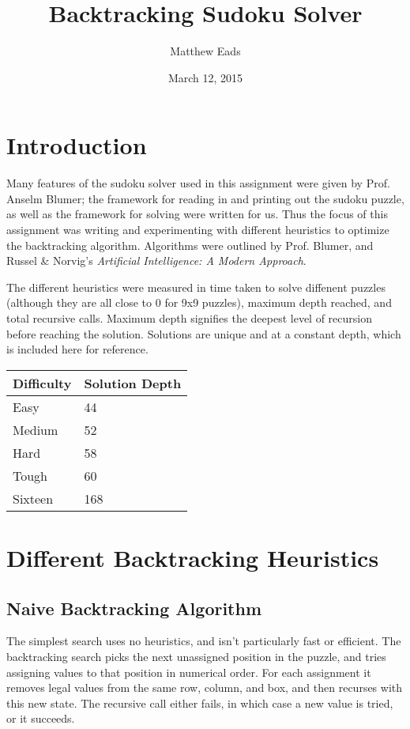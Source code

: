 \documentclass{article}
\begin{document}
\title{Backtracking Sudoku Solver}
\date{March 12, 2015}
\author{Matthew Eads}
\maketitle
\section{Introduction}
Many features of the sudoku solver used in this assignment were given
by Prof. Anselm Blumer; the framework for reading in and printing out the sudoku
puzzle, as well as the framework for solving were written for us.
Thus the focus of this assignment was writing and experimenting with
different heuristics to optimize the backtracking algorithm. Algorithms were
outlined by Prof. Blumer, and Russel \&{} Norvig's \textit{Artificial Intelligence:
A Modern Approach}.

The different heuristics were measured in time taken to solve diffenent
puzzles (although they are all close to 0 for 9x9 puzzles), 
maximum depth reached, and total recursive calls. 
Maximum depth signifies the deepest level of recursion before reaching
the solution. Solutions are unique and at a constant depth, which is
included here for reference. \bigskip

\begin{tabular}{l | l}
Difficulty & Solution Depth \\ \hline
Easy & 44 \\
Medium & 52 \\
Hard & 58 \\
Tough & 60 \\
Sixteen & 168 \\
\end{tabular}

\section{Different Backtracking Heuristics}
\subsection{Naive Backtracking Algorithm}
The simplest search uses no heuristics, and isn't particularly fast or
efficient. The backtracking search picks the next unassigned position
in the puzzle, and tries assigning values to that position in numerical
order. For each assignment it removes legal values from the same row, column,
and box, and then recurses with this new state. The recursive call either fails,
in which case a new value is tried, or it succeeds.
\end{document}
